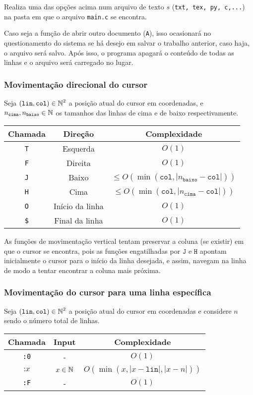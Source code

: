 \documentclass[a4paper, 11pt]{article}
\begin{document}
Realiza uma das opções acima num arquivo de texto $s$ (\texttt{txt, tex, py, c,...}) na pasta em que o arquivo \texttt{main.c} se encontra.

Caso seja a função de abrir outro documento (\texttt{A}), isso ocasionará no questionamento do sistema se há desejo em salvar o trabalho anterior, caso haja, o arquivo será salvo. Após isso, o programa apagará o conteúdo de todas as linhas e o arquivo será carregado no lugar.

\subsubsection*{Movimentação direcional do cursor}

Seja $(\texttt{lin}, \texttt{col}) \in \operatorname{\mathbb{N}}^2$ a posição atual do cursor em coordenadas, e $n_{\texttt{cima}}, n_{\texttt{baixo}} \in \operatorname{\mathbb{N}}$ os tamanhos das linhas de cima e de baixo respectivamente.
\begin{table}[H]
	\centering
	\begin{tabular}{|c|c|c|}
		\hline
		\textbf{Chamada} & \textbf{Direção} & \textbf{Complexidade}
		\\ 
		\hline
		\texttt{T} & Esquerda 		 & $O(1)$ \\
		\texttt{F} & Direita 		 & $O(1)$ \\
		\texttt{J} & Baixo 			 & $\leqslant O( \min(\texttt{col}, |n_{\texttt{baixo}}- \texttt{col}|))$ \\
		\texttt{H} & Cima 			 & $\leqslant O(\min(\texttt{col}, |n_{\texttt{cima}}- \texttt{col}|))$ \\
		\texttt{O} & Início da linha & $O(1)$ \\
		\texttt{\$}& Final da linha  & $O(1)$ \\
		\hline
	\end{tabular}
\end{table}

As funções de movimentação vertical tentam preservar a coluna (se existir) em que o cursor se encontra, pois as funções engatilhadas por $\texttt J$ e $\texttt H$ apontam inicialmente o cursor para o início da linha desejada, e assim, navegam na linha de modo a tentar encontrar a coluna mais próxima.  

\subsubsection*{Movimentação do cursor para uma linha específica}

Seja $(\texttt{lin}, \texttt{col}) \in \operatorname{\mathbb{N}}^2$ a posição atual do cursor em coordenadas e considere $n$ sendo o número total de linhas.
\begin{table}[H]
	\centering
	\begin{tabular}{|c|c|c|}
		\hline
		\textbf{Chamada} & \textbf{Input} & \textbf{Complexidade}
		\\ 
		\hline
		\texttt{:0} & - & $O(1)$ \\
		$\texttt{:}x$ & $x\in \operatorname{\mathbb{N}}$ & $O(\min(x, |x-\texttt{lin}|, |x-n|))$ \\
		\texttt{:F} & - & $O(1)$ \\
		\hline
	\end{tabular}
\end{table}
\end{document}
